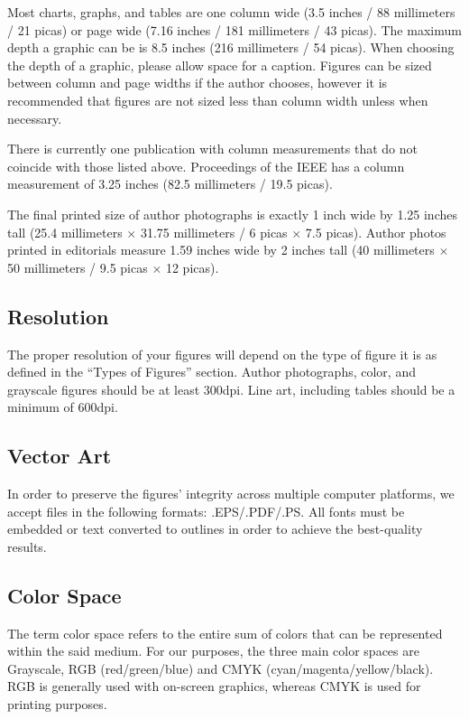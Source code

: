 \documentclass[journal]{IEEEtai}
\begin{document}
Most charts, graphs, and tables are one column wide (3.5 inches / 88 millimeters / 21 picas) or page wide (7.16 inches / 181 millimeters / 43 picas). The maximum depth a graphic can be is 8.5 inches (216 millimeters / 54 picas). When choosing the depth of a graphic, please allow space for a caption. Figures can be sized between column and page widths if the author chooses, however it is recommended that figures are not sized less than column width unless when necessary.

There is currently one publication with column measurements that do not coincide with those listed above. Proceedings of the IEEE has a column measurement of 3.25 inches (82.5 millimeters / 19.5 picas). 

The final printed size of author photographs is exactly 1 inch wide by 1.25 inches tall (25.4 millimeters $\times$ 31.75 millimeters / 6 picas $\times$ 7.5 picas). Author photos printed in editorials measure 1.59 inches wide by 2 inches tall (40 millimeters $\times$ 50 millimeters / 9.5 picas $\times$ 12 picas).

\subsection{Resolution}

The proper resolution of your figures will depend on the type of figure it is as defined in the ``Types of Figures'' section. Author photographs, color, and grayscale figures should be at least 300dpi. Line art, including tables should be a minimum of 600dpi.

\subsection{Vector Art}

In order to preserve the figures' integrity across multiple computer platforms, we accept files in the following formats: .EPS/.PDF/.PS. All fonts must be embedded or text converted to outlines in order to achieve the best-quality results.

\subsection{Color Space}

The term color space refers to the entire sum of colors that can be represented within the said medium. For our purposes, the three main color spaces are Grayscale, RGB (red/green/blue) and CMYK (cyan/magenta/yellow/black). RGB is generally used with on-screen graphics, whereas CMYK is used for printing purposes.
\end{document}
